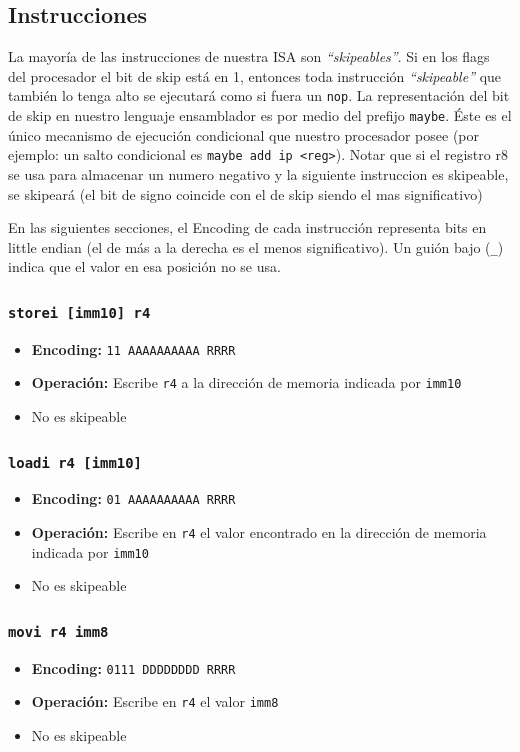 \documentclass{article}
\begin{document}
\subsection{Instrucciones}

La mayoría de las instrucciones de nuestra ISA son \emph{``skipeables''}. Si en los flags del procesador el bit de skip está en 1, entonces toda instrucción \emph{``skipeable''} que también lo tenga alto se ejecutará como si fuera un \texttt{nop}. La representación del bit de skip en nuestro lenguaje ensamblador es por medio del prefijo \texttt{maybe}. Éste es el único mecanismo de ejecución condicional que nuestro procesador posee (por ejemplo: un salto condicional es \texttt{maybe add ip <reg>}). Notar que si el registro r8 se usa para almacenar un numero negativo y la siguiente instruccion es skipeable, se skipeará (el bit de signo coincide con el de skip siendo el mas significativo)

En las siguientes secciones, el Encoding de cada instrucción representa bits en little endian (el de más a la derecha es el menos significativo). Un guión bajo (\texttt{\_}) indica que el valor en esa posición no se usa.

\subsubsection{\texttt{storei [imm10] r4}}
\begin{itemize}
    \item \textbf{Encoding:} \texttt{11 AAAAAAAAAA RRRR}
    \item \textbf{Operación:} Escribe \texttt{r4} a la dirección de memoria indicada por \texttt{imm10}
    \item No es skipeable
\end{itemize}

\subsubsection{\texttt{loadi r4 [imm10]}}
\begin{itemize}
    \item \textbf{Encoding:} \texttt{01 AAAAAAAAAA RRRR}
    \item \textbf{Operación:} Escribe en \texttt{r4} el valor encontrado en la dirección de memoria indicada por \texttt{imm10}
    \item No es skipeable
\end{itemize}

\subsubsection{\texttt{movi r4 imm8}}
\begin{itemize}
    \item \textbf{Encoding:} \texttt{0111 DDDDDDDD RRRR}
    \item \textbf{Operación:} Escribe en \texttt{r4} el valor \texttt{imm8}
    \item No es skipeable
\end{itemize}
\end{document}
